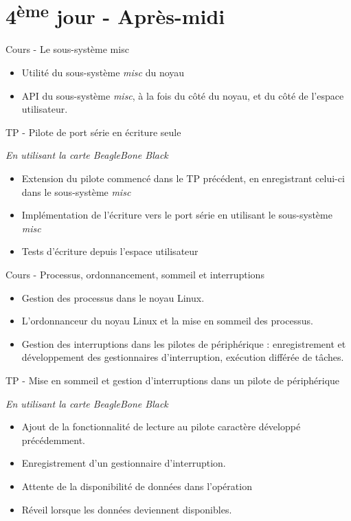 \documentclass[a4paper,12pt,obeyspaces,spaces,hyphens]{article}
\begin{document}
\section{4\textsuperscript{ème} jour - Après-midi}

\feagendatwocolumn
{Cours - Le sous-système misc}
{
  \begin{itemize}
  \item Utilité du sous-système {\em misc} du noyau
  \item API du sous-système {\em misc}, à la fois du côté du noyau, et
    du côté de l'espace utilisateur.
  \end{itemize}
}
{TP - Pilote de port série en écriture seule}
{
  {\em En utilisant la carte BeagleBone Black}
  \begin{itemize}
  \item Extension du pilote commencé dans le TP précédent, en
    enregistrant celui-ci dans le sous-système {\em misc}
  \item Implémentation de l'écriture vers le port série en
    utilisant le sous-système {\em misc}
  \item Tests d'écriture depuis l'espace utilisateur
  \end{itemize}
}

\feagendatwocolumn
{Cours - Processus, ordonnancement, sommeil et interruptions}
{
  \begin{itemize}
  \item Gestion des processus dans le noyau Linux.
  \item L'ordonnanceur du noyau Linux et la mise en sommeil des processus.
  \item Gestion des interruptions dans les pilotes de périphérique :
    enregistrement et développement des gestionnaires d'interruption,
    exécution différée de tâches.
  \end{itemize}
}
{TP - Mise en sommeil et gestion d'interruptions dans un pilote de périphérique}
{
  {\em En utilisant la carte BeagleBone Black}
  \begin{itemize}
  \item Ajout de la fonctionnalité de lecture au pilote caractère développé
    précédemment.
  \item Enregistrement d'un gestionnaire d'interruption.
  \item Attente de la disponibilité de données dans l'opération 
  \item Réveil lorsque les données deviennent disponibles.
  \end{itemize}
}
\end{document}
